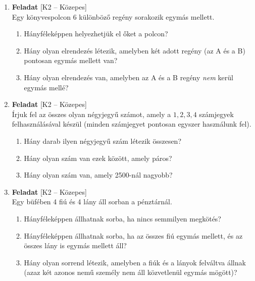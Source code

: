 \documentclass[12pt,a4paper]{article}
\begin{document}
\begin{enumerate}[label=\arabic*., leftmargin=*]
    \item \textbf{Feladat} \textsf{\small [K2 – Közepes]} \\
    Egy könyvespolcon 6 különböző regény sorakozik egymás mellett.
    \begin{enumerate}[label=\alph*)]
        \item Hányféleképpen helyezhetjük el őket a polcon?
        \item Hány olyan elrendezés létezik, amelyben két adott regény (az A és a B) pontosan egymás mellett van?
        \item Hány olyan elrendezés van, amelyben az A és a B regény \emph{nem} kerül egymás mellé?
    \end{enumerate}

    \vspace{0.4cm}

    \item \textbf{Feladat} \textsf{\small [K2 – Közepes]} \\
    Írjuk fel az összes olyan négyjegyű számot, amely a $1, 2, 3, 4$ számjegyek felhasználásával készül (minden számjegyet pontosan egyszer használunk fel). 
    \begin{enumerate}[label=\alph*)]
        \item Hány darab ilyen négyjegyű szám létezik összesen?
        \item Hány olyan szám van ezek között, amely páros?
        \item Hány olyan szám van, amely 2500-nál nagyobb?
    \end{enumerate}

    \vspace{0.4cm}

    \item \textbf{Feladat} \textsf{\small [K2 – Közepes]} \\
    Egy büfében 4 fiú és 4 lány áll sorban a pénztárnál.
    \begin{enumerate}[label=\alph*)]
        \item Hányféleképpen állhatnak sorba, ha nincs semmilyen megkötés?
        \item Hányféleképpen állhatnak sorba, ha az összes fiú egymás mellett, és az összes lány is egymás mellett áll?
        \item Hány olyan sorrend létezik, amelyben a fiúk és a lányok felváltva állnak (azaz két azonos nemű személy nem áll közvetlenül egymás mögött)?
    \end{enumerate}


\end{enumerate}
\end{document}
